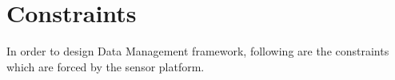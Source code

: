 \documentclass[conference]{IEEEtran}
\begin{document}
%	
\section{Constraints}\label{sec:constraints}
In order to design Data Management framework, following are the constraints which are forced by the sensor 
platform.
%
%
\end{document}
